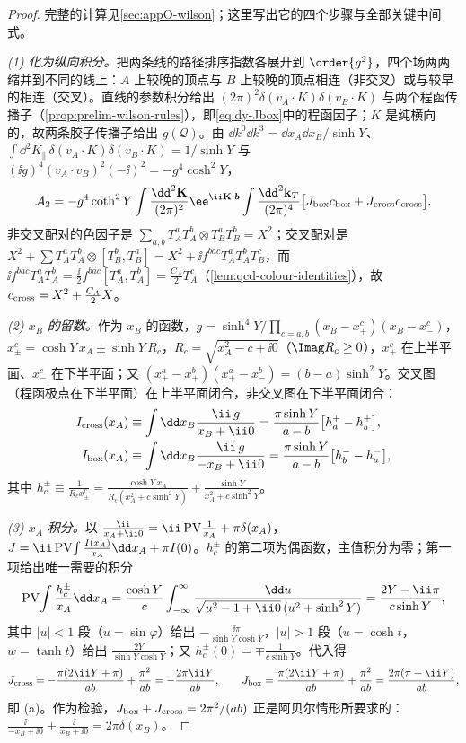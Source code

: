 \begin{proof}
完整的计算见\cref{sec:appO-wilson}；这里写出它的四个步骤与全部关键中间式。

\emph{(1) 化为纵向积分。}把两条线的路径排序指数各展开到 $\order{g^2}$，四个场两两缩并到不同的线上：$A$ 上较晚的顶点与 $B$ 上较晚的顶点相连（非交叉）或与较早的相连（交叉）。直线的参数积分给出 $(2\pi)^2\delta(v_A\cdot K)\delta(v_B\cdot K)$ 与两个程函传播子（\cref{prop:prelim-wilson-rules}），即\cref{eq:dy-Jbox}中的程函因子；$K$ 是纯横向的，故两条胶子传播子给出 $g(\mathcal Q)$。由 $\dd k^0\dd k^3=\dd x_A\dd x_B/\sinh Y$、$\int\dd^2K_\parallel\,\delta(v_A\cdot K)\delta(v_B\cdot K)=1/\sinh Y$ 与 $(\ii g)^4(v_A\cdot v_B)^2(-\ii)^2=-g^4\cosh^2Y$，
\[
\mathcal A_2=-g^4\coth^2Y\int\frac{\dd^2\mathbf K}{(2\pi)^2}\ee^{\ii\mathbf K\cdot\boldsymbol b}\int\frac{\dd^2\mathbf k_T}{(2\pi)^4}\big[J_{\rm box}c_{\rm box}+J_{\rm cross}c_{\rm cross}\big].
\]
非交叉配对的色因子是 $\sum_{a,b}T^a_AT^b_A\otimes T^a_BT^b_B=X^2$；交叉配对是 $X^2+\sum T^a_AT^b_A\otimes[T^b_B,T^a_B]=X^2+\ii f^{bac}T^a_AT^b_AT^c_B$，而 $\ii f^{bac}T^a_AT^b_A=\frac\ii2f^{bac}[T^a_A,T^b_A]=\frac{C_A}2T^c_A$（\cref{lem:qcd-colour-identities}），故 $c_{\rm cross}=X^2+\frac{C_A}2X$。

\emph{(2) $x_B$ 的留数。}作为 $x_B$ 的函数，$g=\sinh^4Y\big/\prod_{c=a,b}(x_B-x^c_+)(x_B-x^c_-)$，$x^c_\pm=\cosh Y\,x_A\pm\sinh Y\,R_c$，$R_c=\sqrt{x_A^2-c+\ii0}$（$\Imag R_c\ge0$），$x^c_+$ 在上半平面、$x^c_-$ 在下半平面；又 $(x^a_+-x^b_+)(x^a_+-x^b_-)=(b-a)\sinh^2Y$。交叉图（程函极点在下半平面）在上半平面闭合，非交叉图在下半平面闭合：
\[
\begin{aligned}
I_{\rm cross}(x_A)&\equiv\int\dd x_B\frac{\ii\,g}{x_B+\ii0}=\frac{\pi\sinh Y}{a-b}\big[h^+_a-h^+_b\big],\\
I_{\rm box}(x_A)&\equiv\int\dd x_B\frac{\ii\,g}{-x_B+\ii0}=\frac{\pi\sinh Y}{a-b}\big[h^-_b-h^-_a\big],
\end{aligned}
\]
其中 $h^\pm_c\equiv\frac{1}{R_cx^c_\pm}=\frac{\cosh Y\,x_A}{R_c(x_A^2+c\sinh^2Y)}\mp\frac{\sinh Y}{x_A^2+c\sinh^2Y}$。

\emph{(3) $x_A$ 积分。}以 $\frac{\ii}{x_A+\ii0}=\ii\,{\rm PV}\frac1{x_A}+\pi\delta(x_A)$，$J=\ii\,{\rm PV}\!\int\frac{I(x_A)}{x_A}\dd x_A+\pi I(0)$。$h^\pm_c$ 的第二项为偶函数，主值积分为零；第一项给出唯一需要的积分
\[
{\rm PV}\!\int\frac{h^\pm_c}{x_A}\dd x_A=\frac{\cosh Y}{c}\int_{-\infty}^{\infty}\frac{\dd u}{\sqrt{u^2-1+\ii0}\,(u^2+\sinh^2Y)}=\frac{2Y-\ii\pi}{c\sinh Y},
\]
其中 $|u|<1$ 段（$u=\sin\varphi$）给出 $-\frac{\ii\pi}{\sinh Y\cosh Y}$，$|u|>1$ 段（$u=\cosh t$，$w=\tanh t$）给出 $\frac{2Y}{\sinh Y\cosh Y}$；又 $h^\pm_c(0)=\mp\frac1{c\sinh Y}$。代入得
\[
J_{\rm cross}=-\frac{\pi(2\ii Y+\pi)}{ab}+\frac{\pi^2}{ab}=-\frac{2\pi\ii Y}{ab},\qquad
J_{\rm box}=\frac{\pi(2\ii Y+\pi)}{ab}+\frac{\pi^2}{ab}=\frac{2\pi(\pi+\ii Y)}{ab},
\]
即 (a)。作为检验，$J_{\rm box}+J_{\rm cross}=2\pi^2/(ab)$ 正是阿贝尔情形所要求的：$\frac{\ii}{-x_B+\ii0}+\frac{\ii}{x_B+\ii0}=2\pi\delta(x_B)$。


\end{proof}
